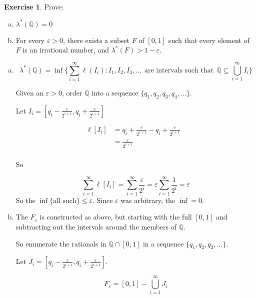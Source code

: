 \documentclass[11pt,oneside]{article}
\numberwithin{equation}{section}
\theoremstyle{definition}
\newtheorem{exercise}{Exercise}
\def\QQ{\mathbb{Q}}
\begin{document}
\begin{exercise}
  Prove:
  \begin{enumerate}[(a)]
  \item
    $\lambda ^* ( \QQ ) = 0 $
  \item
    For every $ \varepsilon > 0$, there exists a subset $F$ of $[0,1]$ such that every element of $F$ is an irrational number,
    and $ \lambda ^* ( F) > 1 - \varepsilon $.
    
  \end{enumerate}
\end{exercise}
\begin{solution}
  \begin{enumerate}[(a)]
  \item
    $$
    \lambda ^* ( \QQ) = \inf \{ \sum _{i=1} ^\infty \ell ( I _ i ) : I_1, I_2, I_3, ... \ \ \text{are intervals such that} \ \ \QQ \subseteq \bigcup \limits _ {i=1} ^ \infty I_i \} 
    $$
    
    Given an $\varepsilon > 0$, order $\QQ $ into a sequence $ \{ q_1, q_2, q_3, q_4, ... \}$. 
    
    Let $I_i = [q_i - \frac{\varepsilon}{2^{i+1}},  q_i + \frac{\varepsilon}{2^{i+1}} ] $ 
    
    \begin{align*}
      \ell [ I_i ] & = q_i + \frac{\varepsilon}{2^{i+1}} - q_i +  \frac{\varepsilon}{2^{i+1}} & \\  
      & = \frac{\varepsilon}{2^{i+1}} & \\  
    \end{align*}
    
    So

    $$
    \sum \limits _ { i=1} ^ \infty \ell [I_i] =  \sum \limits _ { i=1} ^ \infty \frac{\varepsilon}{2^i} = \varepsilon \sum \limits _ {i=1} ^ \infty \frac{1}{2^i}= \varepsilon 
    $$
    So the $ \inf \{ \text{all such} \} \leq \varepsilon$.  Since $\varepsilon$ was arbitrary, the $ \inf = 0$.
    \item
      The $F_\varepsilon$ is constructed as above, but starting with the full $[0,1]$ and subtracting out the intervals around the members of $\QQ$.

      So enumerate the rationals in $ \QQ \cap [0,1]$ in a sequence $ \{ q_1, q_2, q_3, ... \}$.

      Let $J_i =  [ q_i - \frac{\varepsilon}{2^{i+1}},  q_i + \frac{\varepsilon}{2^{i+1}}]$. 
      
      $$
      F_\varepsilon = [0, 1] - \bigcup \limits _ {i = 1} ^ \infty J_i
      $$


\end{enumerate}
\end{solution}
\end{document}
